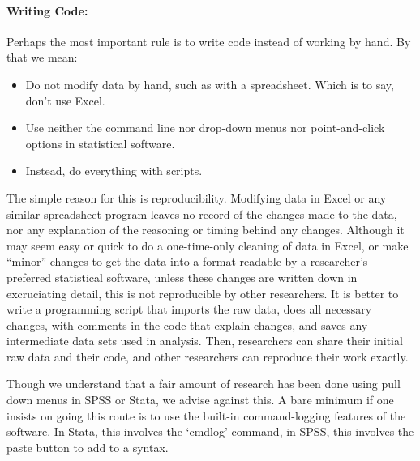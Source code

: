 \documentclass[12pt] {article}
\begin{document}
\paragraph{Writing Code:}
Perhaps the most important rule is to write code instead of working by hand. By
that we mean:

\begin{itemize}
\item
  Do not modify data by hand, such as with a spreadsheet. Which is to
  say, don't use Excel.
\item
  Use neither the command line nor drop-down menus nor point-and-click
  options in statistical software.
\item
  Instead, do everything with scripts.
\end{itemize}

The simple reason for this is reproducibility. Modifying data in Excel
or any similar spreadsheet program leaves no record of the changes made
to the data, nor any explanation of the reasoning or timing behind any
changes. Although it may seem easy or quick to do a one-time-only
cleaning of data in Excel, or make ``minor'' changes to get the data
into a format readable by a researcher's preferred statistical software,
unless these changes are written down in excruciating detail, this is
not reproducible by other researchers. It is better to write a programming
script that imports the raw data, does all necessary changes, with
comments in the code that explain changes, and saves any intermediate
data sets used in analysis. Then, researchers can share their initial
raw data and their code, and other researchers can reproduce their work
exactly.

Though we understand that a fair amount of research has been done using
pull down menus in SPSS or Stata, we advise against this. A bare minimum
if one insists on going this route is to use the built-in
command-logging features of the software. In Stata, this involves the
`cmdlog' command, in SPSS, this involves the paste button to add to a
syntax.
\end{document}

